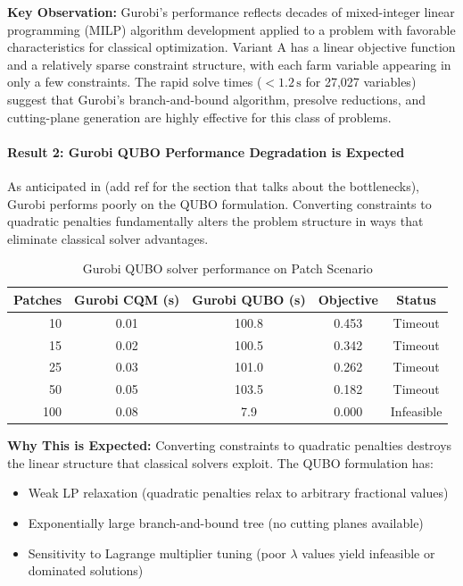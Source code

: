 \textbf{Key Observation:} Gurobi's performance reflects decades of mixed-integer linear programming (MILP) algorithm development applied to a problem with favorable characteristics for classical optimization. Variant A has a linear objective function and a relatively sparse constraint structure, with each farm variable appearing in only a few constraints. The rapid solve times (\(<1.2\,\mathrm{s}\) for 27,027 variables) suggest that Gurobi's branch-and-bound algorithm, presolve reductions, and cutting-plane generation are highly effective for this class of
problems.

\paragraph{Result 2: Gurobi QUBO Performance Degradation is Expected}

As anticipated in (add ref for the section that talks about the bottlenecks), Gurobi performs poorly on the QUBO formulation. Converting constraints to quadratic penalties fundamentally alters the problem structure in ways that eliminate classical solver advantages.

\begin{table}[H]
\centering
\caption{Gurobi QUBO solver performance on Patch Scenario}
\label{tab:gurobi_qubo_degradation}
\begin{tabular}{rcccc}
\toprule
\textbf{Patches} & \textbf{Gurobi CQM (s)} & \textbf{Gurobi QUBO (s)} & \textbf{Objective} & \textbf{Status} \\
\midrule
10 & 0.01 & 100.8 & 0.453 & Timeout \\
15 & 0.02 & 100.5 & 0.342 & Timeout \\
25 & 0.03 & 101.0 & 0.262 & Timeout \\
50 & 0.05 & 103.5 & 0.182 & Timeout \\
100 & 0.08 & 7.9 & 0.000 & Infeasible \\
\bottomrule
\end{tabular}
\end{table}

\textbf{Why This is Expected:} Converting constraints to quadratic penalties destroys the linear structure that classical solvers exploit. The QUBO formulation has:
\begin{itemize}
    \item Weak LP relaxation (quadratic penalties relax to arbitrary fractional values)
    \item Exponentially large branch-and-bound tree (no cutting planes available)
    \item Sensitivity to Lagrange multiplier tuning (poor $\lambda$ values yield infeasible or dominated solutions)
\end{itemize}



